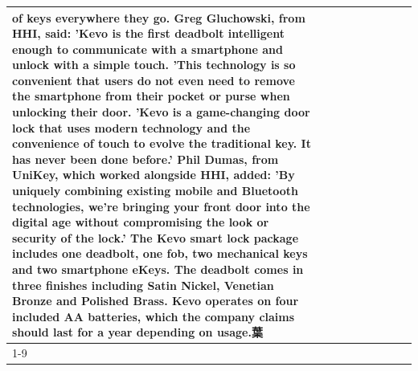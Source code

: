 \begin{table}[H]
\begin{tabular}{lllrlllll}
of keys everywhere they go. Greg Gluchowski, from HHI, said: 'Kevo is the first deadbolt intelligent enough to communicate with a smartphone and unlock with a simple touch. 'This technology is so convenient that users do not even need to remove the smartphone from their pocket or purse when unlocking their door. 'Kevo is a game-changing door lock that uses modern technology and the convenience of touch to evolve the traditional key. It has never been done before.' Phil Dumas, from UniKey, which worked alongside HHI, added: 'By uniquely combining existing mobile and Bluetooth technologies, we’re bringing your front door into the digital age without compromising the look or security of the lock.' The Kevo smart lock package includes one deadbolt, one fob, two mechanical keys and two smartphone eKeys. The deadbolt comes in three finishes including Satin Nickel, Venetian Bronze and Polished Brass. Kevo operates on four included AA batteries, which the company claims should last for a year depending on usage.葉 \\
\cline{1-9}

\end{tabular}
\end{table}
